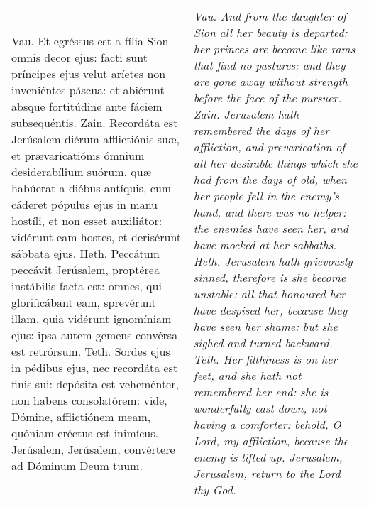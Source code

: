 \begin{tabular}{p{8cm} | p{8cm}}
Vau. Et egréssus est a fília Sion omnis decor ejus: facti sunt príncipes ejus velut aríetes non inveniéntes páscua: et abiérunt absque fortitúdine ante fáciem subsequéntis.
Zain. Recordáta est Jerúsalem diérum afflictiónis suæ, et prævaricatiónis ómnium desiderabílium suórum, quæ habúerat a diébus antíquis, cum cáderet pópulus ejus in manu hostíli, et non esset auxiliátor: vidérunt eam hostes, et derisérunt sábbata ejus.
Heth. Peccátum peccávit Jerúsalem, proptérea instábilis facta est: omnes, qui glorificábant eam, sprevérunt illam, quia vidérunt ignomíniam ejus: ipsa autem gemens convérsa est retrórsum.
Teth. Sordes ejus in pédibus ejus, nec recordáta est finis sui: depósita est veheménter, non habens consolatórem: vide, Dómine, afflictiónem meam, quóniam eréctus est inimícus.
Jerúsalem, Jerúsalem, convértere ad Dóminum Deum tuum.
& \textit{Vau. And from the daughter of Sion all her beauty is departed: her princes are become like rams that find no pastures: and they are gone away without strength before the face of the pursuer.
Zain. Jerusalem hath remembered the days of her affliction, and prevarication of all her desirable things which she had from the days of old, when her people fell in the enemy's hand, and there was no helper: the enemies have seen her, and have mocked at her sabbaths.
Heth. Jerusalem hath grievously sinned, therefore is she become unstable: all that honoured her have despised her, because they have seen her shame: but she sighed and turned backward.
Teth. Her filthiness is on her feet, and she hath not remembered her end: she is wonderfully cast down, not having a comforter: behold, O Lord, my affliction, because the enemy is lifted up.
Jerusalem, Jerusalem, return to the Lord thy God.
}
\end{tabular}